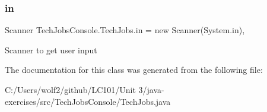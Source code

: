 \subsubsection{\texorpdfstring{in}{in}}
{\footnotesize\ttfamily Scanner Tech\+Jobs\+Console.\+Tech\+Jobs.\+in = new Scanner(System.\+in)\hspace{0.3cm}{\ttfamily [static]}, {\ttfamily [private]}}

Scanner to get user input 

The documentation for this class was generated from the following file\+:\begin{DoxyCompactItemize}
\item 
C\+:/\+Users/wolf2/github/\+L\+C101/\+Unit 3/java-\/exercises/src/\+Tech\+Jobs\+Console/Tech\+Jobs.\+java\end{DoxyCompactItemize}
